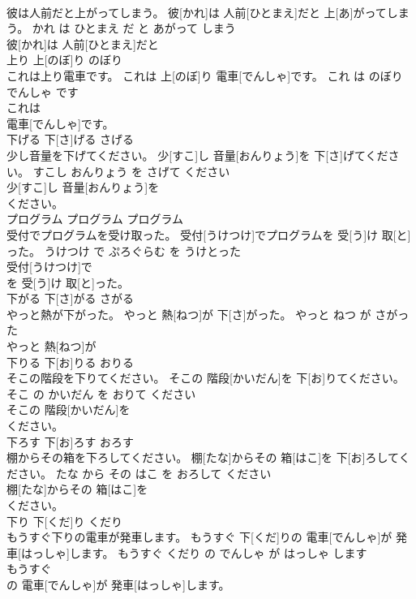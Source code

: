 \documentclass[8pt]{extreport}
\begin{document}
\begin{CJK}{UTF8}{min}
\\	彼は人前だと上がってしまう。	彼[かれ]は 人前[ひとまえ]だと 上[あ]がってしまう。	かれ は ひとまえ だ と あがって しまう	
\\	彼[かれ]は 人前[ひとまえ]だと
\\	上り	上[のぼ]り	のぼり	
\\	これは上り電車です。	これは 上[のぼ]り 電車[でんしゃ]です。	これ は のぼり でんしゃ です	
\\	これは
\\	電車[でんしゃ]です。			
\\	下げる	下[さ]げる	さげる	
\\	少し音量を下げてください。	少[すこ]し 音量[おんりょう]を 下[さ]げてください。	すこし おんりょう を さげて ください	
\\	少[すこ]し 音量[おんりょう]を
\\	ください。			
\\	プログラム	プログラム	プログラム	
\\	受付でプログラムを受け取った。	受付[うけつけ]でプログラムを 受[う]け 取[と]った。	うけつけ で ぷろぐらむ を うけとった	
\\	受付[うけつけ]で
\\	を 受[う]け 取[と]った。			
\\	下がる	下[さ]がる	さがる	
\\	やっと熱が下がった。	やっと 熱[ねつ]が 下[さ]がった。	やっと ねつ が さがった	
\\	やっと 熱[ねつ]が
\\	下りる	下[お]りる	おりる	
\\	そこの階段を下りてください。	そこの 階段[かいだん]を 下[お]りてください。	そこ の かいだん を おりて ください	
\\	そこの 階段[かいだん]を
\\	ください。			
\\	下ろす	下[お]ろす	おろす	
\\	棚からその箱を下ろしてください。	棚[たな]からその 箱[はこ]を 下[お]ろしてください。	たな から その はこ を おろして ください	
\\	棚[たな]からその 箱[はこ]を
\\	ください。			
\\	下り	下[くだ]り	くだり	
\\	もうすぐ下りの電車が発車します。	もうすぐ 下[くだ]りの 電車[でんしゃ]が 発車[はっしゃ]します。	もうすぐ くだり の でんしゃ が はっしゃ します	
\\	もうすぐ
\\	の 電車[でんしゃ]が 発車[はっしゃ]します。			

\end{CJK}
\end{document}
